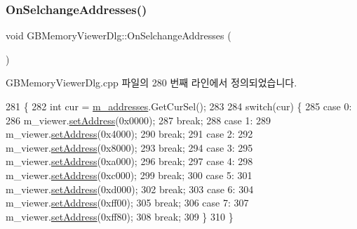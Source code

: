 \subsubsection{\texorpdfstring{On\+Selchange\+Addresses()}{OnSelchangeAddresses()}}
{\footnotesize\ttfamily void G\+B\+Memory\+Viewer\+Dlg\+::\+On\+Selchange\+Addresses (\begin{DoxyParamCaption}{ }\end{DoxyParamCaption})\hspace{0.3cm}{\ttfamily [protected]}}



G\+B\+Memory\+Viewer\+Dlg.\+cpp 파일의 280 번째 라인에서 정의되었습니다.


\begin{DoxyCode}
281 \{
282   \textcolor{keywordtype}{int} cur = \mbox{\hyperlink{class_g_b_memory_viewer_dlg_af3cb69fc0a793bfb57e2abebbb300e4d}{m\_addresses}}.GetCurSel();
283   
284   \textcolor{keywordflow}{switch}(cur) \{
285   \textcolor{keywordflow}{case} 0:
286     m\_viewer.\mbox{\hyperlink{class_memory_viewer_abe391051455e116889da0613c19888a2}{setAddress}}(0x0000);
287     \textcolor{keywordflow}{break};
288   \textcolor{keywordflow}{case} 1:
289     m\_viewer.\mbox{\hyperlink{class_memory_viewer_abe391051455e116889da0613c19888a2}{setAddress}}(0x4000);
290     \textcolor{keywordflow}{break};
291   \textcolor{keywordflow}{case} 2:
292     m\_viewer.\mbox{\hyperlink{class_memory_viewer_abe391051455e116889da0613c19888a2}{setAddress}}(0x8000);
293     \textcolor{keywordflow}{break};
294   \textcolor{keywordflow}{case} 3:
295     m\_viewer.\mbox{\hyperlink{class_memory_viewer_abe391051455e116889da0613c19888a2}{setAddress}}(0xa000);
296     \textcolor{keywordflow}{break};
297   \textcolor{keywordflow}{case} 4:
298     m\_viewer.\mbox{\hyperlink{class_memory_viewer_abe391051455e116889da0613c19888a2}{setAddress}}(0xc000);
299     \textcolor{keywordflow}{break};
300   \textcolor{keywordflow}{case} 5:
301     m\_viewer.\mbox{\hyperlink{class_memory_viewer_abe391051455e116889da0613c19888a2}{setAddress}}(0xd000);
302     \textcolor{keywordflow}{break};
303   \textcolor{keywordflow}{case} 6:
304     m\_viewer.\mbox{\hyperlink{class_memory_viewer_abe391051455e116889da0613c19888a2}{setAddress}}(0xff00);
305     \textcolor{keywordflow}{break};
306   \textcolor{keywordflow}{case} 7:
307     m\_viewer.\mbox{\hyperlink{class_memory_viewer_abe391051455e116889da0613c19888a2}{setAddress}}(0xff80);
308     \textcolor{keywordflow}{break};
309   \}
310 \}
\end{DoxyCode}
